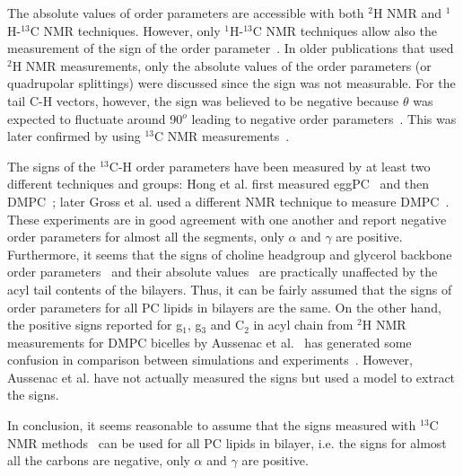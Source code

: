 \documentclass[aps,prl,superscriptaddress,twocolumn]{revtex4}
\begin{document}
The absolute values of order parameters are accessible with both $^2$H NMR and $^1$H-$^{13}$C NMR techniques. 
However, only $^1$H-$^{13}$C NMR techniques allow also the measurement of the sign of the order parameter~\cite{hong95a,hong95b,gross97}. 
In older publications that used $^2$H NMR measurements, only the absolute values of the order parameters (or quadrupolar splittings) were discussed 
since the sign was not measurable. For the tail C-H vectors, however, the sign was believed to be negative because $\theta$ was expected to fluctuate 
around 90$^o$ leading to negative order parameters~\cite{seelig77c}. This was later confirmed by using $^{13}$C NMR measurements~\cite{hong95a}. 

The signs of the $^{13}$C-H order parameters have been measured by at least two different techniques and groups: Hong et al. first measured 
eggPC~\cite{hong95a} and then DMPC~\cite{hong95b}; later Gross et al. used a different NMR technique to measure DMPC~\cite{gross97}. 
These experiments are in good agreement with one another and report negative order parameters for almost all the segments, only $\alpha$ and $\gamma$ are positive.
Furthermore, it seems that the signs of choline headgroup and glycerol backbone order parameters~\cite{hong95a,hong95b,gross97} 
and their absolute values~\cite{gally81,ferreira13} are practically unaffected by the acyl tail contents of the bilayers. 
Thus, it can be fairly assumed that the signs of order parameters for all PC lipids in bilayers are the same. 
On the other hand, the positive signs reported for g$_1$, g$_3$ and C$_2$ in acyl chain from $^2$H NMR measurements for DMPC bicelles by Aussenac et al.~\cite{aussenac03}
has generated some confusion in comparison between simulations and experiments~\cite{hogberg08}. However, Aussenac et al. have not actually measured the 
signs but used a model to extract the signs. 

In conclusion, it seems reasonable to assume that the signs measured with $^{13}$C NMR methods~\cite{hong95a,hong95b,gross97}
can be used for all PC lipids in bilayer, i.e. the signs for almost all the carbons are negative, only  $\alpha$ and $\gamma$ are positive.
\end{document}
